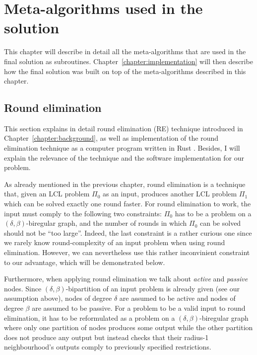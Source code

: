 \chapter{Meta-algorithms used in the solution}
\label{chapter:environment}

This chapter will describe in detail all the meta-algorithms that are
used in the final solution as subroutines.
Chapter~\ref{chapter:implementation} will then
describe how the final solution was built on top of the meta-algorithms
described in this chapter.

\section{Round elimination}

This section explains in detail round elimination (RE)
technique introduced in Chapter~\ref{chapter:background}, as well as
implementation of the round elimination technique as a computer
program written in Rust \cite{Brandt2019, Olivetti2020}.
Besides, I will explain the relevance of the technique
and the software implementation for our problem.

As already mentioned in the previous chapter, round elimination
is a technique that, given an LCL problem $\Pi_0$ as an input, produces
another LCL problem $\Pi_1$ which can be solved exactly one round
faster. For round elimination to work, the input must comply
to the following two constraints: $\Pi_0$ has to be a problem on a $(\delta, \beta)$-biregular
graph, and the number of rounds in which $\Pi_0$ can be solved
should not be ``too large''. Indeed, the last constraint is a rather curious one
since we rarely know round-complexity of an input problem when using
round elimination. However, we can nevertheless use this rather inconvinient constraint
to our advantage, which will be demonstrated below.

Furthermore, when applying round elimination we talk about \emph{active} and
\emph{passive} nodes. Since $(\delta, \beta)$-bipartition of an input problem is
already given (see our assumption above), nodes of degree $\delta$ are assumed
to be active and nodes of degree $\beta$ are assumed to be passive. For a problem
to be a valid input to round elimination, it has to be reformulated as a problem on
a $(\delta, \beta)$-biregular graph where only one partition of nodes produces
some output while the other partition does not produce any output but instead
checks that their radius-1 neighbourhood's outputs comply to previously
specified restrictions.

